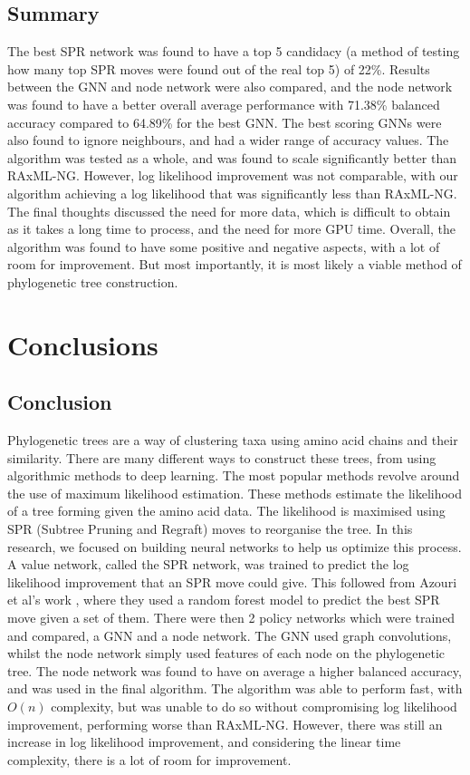 \documentclass{mpaper}
\begin{document}
\subsection{Summary}

The best SPR network was found to have a top 5 candidacy (a method of testing how many top SPR moves were found out of the real top 5) of 22\%. Results between the GNN and node network were also compared, and the node network was found to have a better overall average performance with 71.38\% balanced accuracy compared to 64.89\% for the best GNN. The best scoring GNNs were also found to ignore neighbours, and had a wider range of accuracy values. The algorithm was tested as a whole, and was found to scale significantly better than RAxML-NG. However, log likelihood improvement was not comparable, with our algorithm achieving a log likelihood that was significantly less than RAxML-NG. The final thoughts discussed the need for more data, which is difficult to obtain as it takes a long time to process, and the need for more GPU time. Overall, the algorithm was found to have some positive and negative aspects, with a lot of room for improvement. But most importantly, it is most likely a viable method of phylogenetic tree construction.

\section{Conclusions}

\subsection{Conclusion}

Phylogenetic trees are a way of clustering taxa using amino acid chains and their similarity. There are many different ways to construct these trees, from using algorithmic methods to deep learning. The most popular methods revolve around the use of maximum likelihood estimation. These methods estimate the likelihood of a tree forming given the amino acid data. The likelihood is maximised using SPR (Subtree Pruning and Regraft) moves to reorganise the tree. In this research, we focused on building neural networks to help us optimize this process. A value network, called the SPR network, was trained to predict the log likelihood improvement that an SPR move could give. This followed from Azouri et al's work \cite{azouri2023tree}, where they used a random forest model to predict the best SPR move given a set of them. There were then 2 policy networks which were trained and compared, a GNN and a node network. The GNN used graph convolutions, whilst the node network simply used features of each node on the phylogenetic tree. The node network was found to have on average a higher balanced accuracy, and was used in the final algorithm. The algorithm was able to perform fast, with $O(n)$ complexity, but was unable to do so without compromising log likelihood improvement, performing worse than RAxML-NG. However, there was still an increase in log likelihood improvement, and considering the linear time complexity, there is a lot of room for improvement. 
\end{document}
